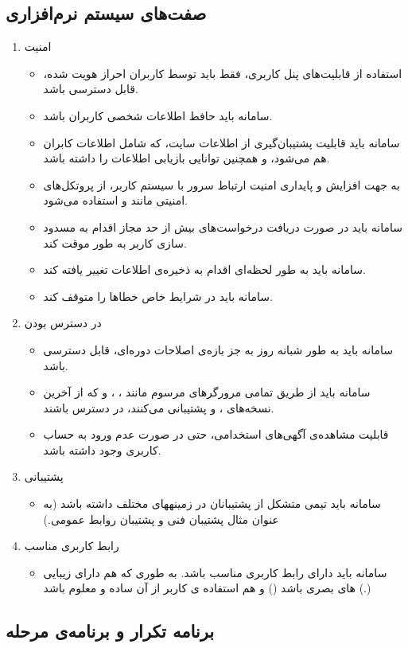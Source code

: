 \documentclass{report}
\begin{document}
			\subsection{صفت‌های سیستم‌ نرم‌افزاری}
				\begin{enumerate}
					\item امنیت
						\begin{itemize}
							\item 
							استفاده از قابلیت‌های پنل کاربری، فقط باید توسط کاربران احراز هویت شده، قابل دسترسی باشد.
							\item 
							سامانه باید حافط اطلاعات شخصی کاربران باشد.
							\item 
							سامانه باید قابلیت پشتیبان‌گیری از اطلاعات سایت، که شامل اطلاعات کابران هم می‌شود، و همچنین توانایی بازیابی اطلاعات را داشته باشد.
							\item 
							به جهت افزایش و پایداری امنیت ارتباط سرور با سیستم کاربر، از پروتکل‌های امنیتی مانند  و  استفاده می‌شود.
							\item 
							سامانه باید در صورت دریافت درخواست‌های بیش از حد مجاز اقدام به مسدود سازی کاربر به طور موقت کند.
							\item 
							سامانه باید به طور لحظه‌ای اقدام به ذخیره‌ی اطلاعات تغییر یافته کند.
							\item 
							سامانه باید در شرایط خاص خطاها را متوقف کند.
						\end{itemize}
					
					\item در دسترس بودن
						\begin{itemize}
							\item 
							سامانه باید به طور شبانه روز به جز بازه‌ی اصلاحات دوره‌ای، قابل دسترسی باشد.
							\item 
							سامانه باید از طریق تمامی مرورگر‌های مرسوم مانند
							، 
							،
							و
							که از آخرین نسخه‌های 
							،
							و
							پشتیبانی می‌کنند، در دسترس باشند.
							\item
							قابلیت مشاهده‌ی آگهی‌های استخدامی، حتی در صورت عدم ورود به حساب کاربری وجود داشته باشد.
						\end{itemize}
					
					\item پشتیبانی
						\begin{itemize}
							\item 
							سامانه باید تیمی متشکل از پشتیبانان در زمینههای مختلف داشته باشد (به عنوان مثال پشتیبان فنی و پشتیبان روابط عمومی.)
						\end{itemize}
					
					\item رابط کاربری مناسب
						\begin{itemize}
							\item 
							سامانه باید دارای رابط کاربری مناسب باشد. به طوری که هم دارای زیبایی های بصری باشد () و هم استفاده ی کاربر از آن ساده و معلوم باشد (.)
						\end{itemize}					
				\end{enumerate}
			\subsection{برنامه تکرار و برنامه‌ی مرحله}
\end{document}
